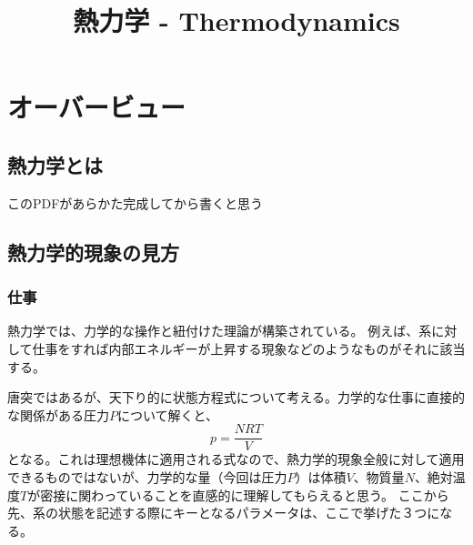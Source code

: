 \documentclass[a4paper]{jsreport}
\title{熱力学 - Thermodynamics}
\begin{document}
    \maketitle

    \tableofcontents

    \chapter{オーバービュー}
        \section{熱力学とは}
        このPDFがあらかた完成してから書くと思う
            
        \section{熱力学的現象の見方}

            \subsection*{仕事}
                熱力学では、力学的な操作と紐付けた理論が構築されている。
                例えば、系に対して仕事をすれば内部エネルギーが上昇する現象などのようなものがそれに該当する。\par
                唐突ではあるが、天下り的に状態方程式について考える。力学的な仕事に直接的な関係がある圧力$P$について解くと、
                \begin{equation}
                    p = \frac{NRT}{V}
                \end{equation}
                となる。これは理想機体に適用される式なので、熱力学的現象全般に対して適用できるものではないが、力学的な量（今回は圧力$P$）は体積$V$、物質量$N$、絶対温度$T$が密接に関わっていることを直感的に理解してもらえると思う。
                ここから先、系の状態を記述する際にキーとなるパラメータは、ここで挙げた３つになる。
\end{document}
